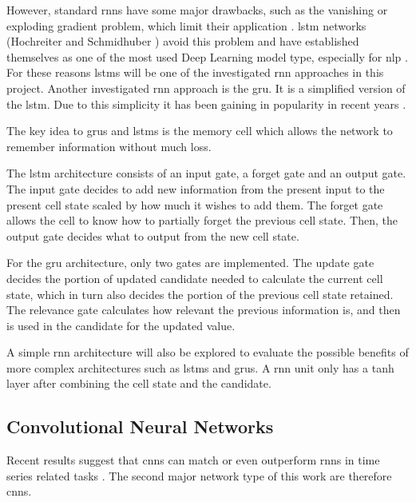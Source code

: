 \documentclass[conference]{IEEEtran}
\begin{document}
However, standard \glspl{rnn} have some major drawbacks, such as the vanishing or exploding gradient problem, which limit their application \cite{Bengio1994}. \gls{lstm} networks (Hochreiter and Schmidhuber \cite{Hochreiter1997}) avoid this problem and have established themselves as one of the most used Deep Learning model type, especially for \gls{nlp} \cite{Wu2016}. For these reasons \glspl{lstm} will be one of the investigated \gls{rnn} approaches in this project. Another investigated \gls{rnn} approach is the \gls{gru}. It is a simplified version of the \gls{lstm}. Due to this simplicity it has been gaining in popularity in recent years \cite{Rana2016}. 

The key idea to \glspl{gru} and \glspl{lstm} is the memory cell which allows the network to remember information without much loss.

The \gls{lstm} architecture consists of an input gate, a forget gate and an output gate. The input gate decides to add new information from the present input to the present cell state scaled by how much it wishes to add them. The forget gate allows the cell to know how to partially forget the previous cell state. Then, the output gate decides what to output from the new cell state.


For the \gls{gru} architecture, only two gates are implemented. The update gate decides the portion of updated candidate needed to calculate the current cell state, which in turn also decides the portion of the previous cell state retained. The relevance gate calculates how relevant the previous information is, and then is used in the candidate for the updated value.

A simple \gls{rnn} architecture will also be explored to evaluate the possible benefits of more complex architectures such as \glspl{lstm} and \glspl{gru}. A \gls{rnn} unit only has a tanh layer after combining the cell state and the candidate.


\subsection{Convolutional Neural Networks}
\label{sec:convolutional_neural_networks}

Recent results suggest that \glspl{cnn} can match or even outperform \glspl{rnn} in time series related tasks \cite{Bai2018}. The second major network type of this work are therefore \glspl{cnn}.
\end{document}
